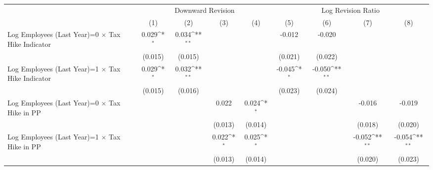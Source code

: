 {
\def\sym#1{\ifmmode^{#1}\else\(^{#1}\)\fi}
\begin{tabular}{l*{8}{c}}
\toprule
                    &\multicolumn{4}{c}{Downward Revision}                                                  &\multicolumn{4}{c}{Log Revision Ratio}                                                 \\\cmidrule(lr){2-5}\cmidrule(lr){6-9}
                    &\multicolumn{1}{c}{(1)}         &\multicolumn{1}{c}{(2)}         &\multicolumn{1}{c}{(3)}         &\multicolumn{1}{c}{(4)}         &\multicolumn{1}{c}{(5)}         &\multicolumn{1}{c}{(6)}         &\multicolumn{1}{c}{(7)}         &\multicolumn{1}{c}{(8)}         \\
\midrule
Log Employees (Last Year)=0 $\times$ Tax Hike Indicator&       0.029\sym{*}  &       0.034\sym{**} &                     &                     &      -0.012         &      -0.020         &                     &                     \\
                    &     (0.015)         &     (0.015)         &                     &                     &     (0.021)         &     (0.022)         &                     &                     \\
Log Employees (Last Year)=1 $\times$ Tax Hike Indicator&       0.029\sym{*}  &       0.032\sym{**} &                     &                     &      -0.045\sym{*}  &      -0.050\sym{**} &                     &                     \\
                    &     (0.015)         &     (0.016)         &                     &                     &     (0.023)         &     (0.024)         &                     &                     \\
Log Employees (Last Year)=0 $\times$ Tax Hike in PP&                     &                     &       0.022         &       0.024\sym{*}  &                     &                     &      -0.016         &      -0.019         \\
                    &                     &                     &     (0.013)         &     (0.014)         &                     &                     &     (0.018)         &     (0.020)         \\
Log Employees (Last Year)=1 $\times$ Tax Hike in PP&                     &                     &       0.022\sym{*}  &       0.025\sym{*}  &                     &                     &      -0.052\sym{**} &      -0.054\sym{**} \\
                    &                     &                     &     (0.013)         &     (0.014)         &                     &                     &     (0.020)         &     (0.023)         \\

\end{tabular}}
